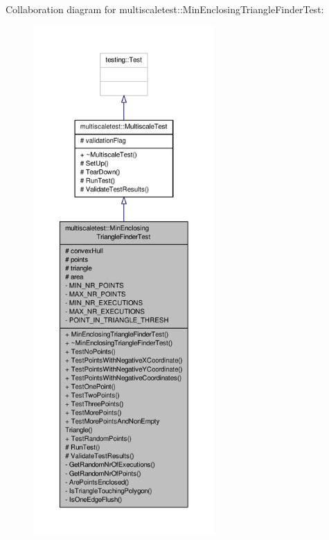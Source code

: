 Collaboration diagram for multiscaletest\-:\-:Min\-Enclosing\-Triangle\-Finder\-Test\-:
\nopagebreak
\begin{figure}[H]
\begin{center}
\leavevmode
\includegraphics[height=550pt]{classmultiscaletest_1_1MinEnclosingTriangleFinderTest__coll__graph}
\end{center}
\end{figure}

